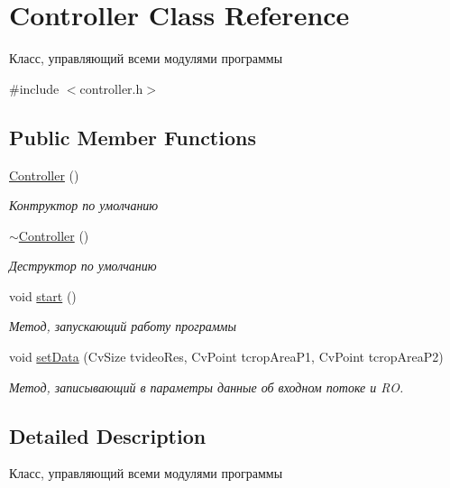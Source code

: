 \hypertarget{class_controller}{\section{Controller Class Reference}
\label{class_controller}
}


Класс, управляющий всеми модулями программы  




{\ttfamily \#include $<$controller.\+h$>$}

\subsection*{Public Member Functions}
\begin{DoxyCompactItemize}
\item 
\hyperlink{class_controller_a95c56822d667e94b031451729ce069a9}{Controller} ()
\begin{DoxyCompactList}\small\item\em Контруктор по умолчанию \end{DoxyCompactList}\item 
\hyperlink{class_controller_a0ab87934c4f7a266cfdb86e0f36bc1b5}{$\sim$\+Controller} ()
\begin{DoxyCompactList}\small\item\em Деструктор по умолчанию \end{DoxyCompactList}\item 
void \hyperlink{class_controller_ad535ad74055e645b7f44b7feeb4e82a8}{start} ()
\begin{DoxyCompactList}\small\item\em Метод, запускающий работу программы \end{DoxyCompactList}\item 
void \hyperlink{class_controller_a0a2e46b465ab2e11e99112d26df01cab}{set\+Data} (Cv\+Size tvideo\+Res, Cv\+Point tcrop\+Area\+P1, Cv\+Point tcrop\+Area\+P2)
\begin{DoxyCompactList}\small\item\em Метод, записывающий в параметры данные об входном потоке и R\+O. \end{DoxyCompactList}\end{DoxyCompactItemize}


\subsection{Detailed Description}
Класс, управляющий всеми модулями программы 

